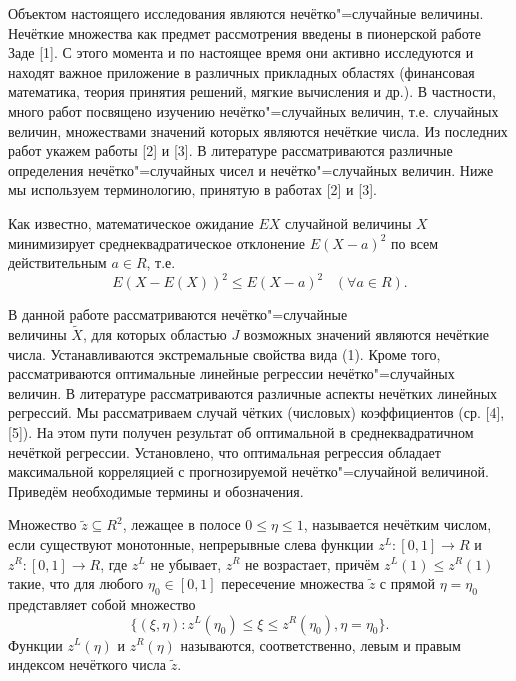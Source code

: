 \vzmscaption

Объектом настоящего исследования являются нечётко"=случайные величины. Нечёткие множества как предмет рассмотрения введены в пионерской работе Заде [1]. С этого момента и по настоящее время они активно исследуются и находят важное приложение в различных прикладных областях (финансовая математика, теория принятия решений, мягкие вычисления и др.). В частности, много работ посвящено изучению нечётко"=случайных величин, т.е. случайных величин, множествами значений которых являются нечёткие числа. Из последних работ укажем работы [2] и [3]. В литературе рассматриваются различные определения нечётко"=случайных чисел и нечётко"=случайных величин. Ниже мы используем терминологию, принятую в работах [2] и [3].



Как известно, математическое ожидание $EX$ случайной величины $X$ минимизирует среднеквадратическое отклонение $E(X-a)^2$ по всем действительным $a\in R$, т.е.
\begin{equation}
E(X-E(X))^2\leq E(X-a)^2\,\,\,\,\,(\forall a\in R).
\end{equation}

В данной работе рассматриваются нечётко"=случайные
\\величины $\tilde{X}$, для которых областью $J$ возможных значений являются нечёткие числа. Устанавливаются экстремальные свойства вида (1). Кроме того, рассматриваются оптимальные линейные регрессии нечётко"=случайных величин. В литературе рассматриваются различные аспекты нечётких линейных регрессий. Мы рассматриваем случай чётких (числовых) коэффициентов (ср. [4], [5]). На этом пути получен результат об оптимальной в среднеквадратичном нечёткой регрессии. Установлено, что оптимальная регрессия обладает максимальной корреляцией с прогнозируемой нечётко"=случайной величиной. Приведём необходимые термины и обозначения.

Множество $\tilde{z}\subseteq R^2$, лежащее в полосе $0\leq \eta\leq 1$, называется нечётким числом, если существуют монотонные, непрерывные слева функции $z^L:[0,1]\rightarrow R$ и $z^R:[0,1]\rightarrow R$, где $z^L$ не убывает, $z^R$ не возрастает, причём $z^L(1)\leq z^R(1)$ такие, что для любого $\eta_0\in[0,1]$ пересечение множества $\tilde{z}$ с прямой $\eta=\eta_0$ представляет собой множество
$$
\{(\xi, \eta): z^L(\eta_0)\leq\xi\leq z^R(\eta_0), \eta=\eta_0\}.
$$
Функции $z^L(\eta)$ и $z^R(\eta)$ называются, соответственно, левым и правым индексом нечёткого числа $\tilde{z}$.

